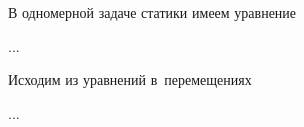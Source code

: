 


\thispagestyle{empty}

\label{chapter:periodicstructures}



\begin{otherlanguage}{russian}

\lettrine[lines=2, findent=2pt, nindent=0pt]{В}{\hspace{-0.25ex}} одномерной задаче статики имеем уравнение

...



\end{otherlanguage}



\begin{otherlanguage}{russian}

Исходим из уравнений в~перемещениях

...



\end{otherlanguage}


